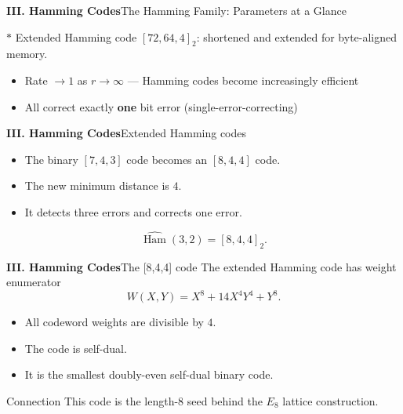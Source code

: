 \begin{frame}{\textbf{III. Hamming Codes}}{The Hamming Family: Parameters at a Glance}
\begin{center}
\end{center}

\vspace{-4pt}
{\footnotesize $*$ Extended Hamming code $[72,64,4]_2$: shortened and extended for byte-aligned memory.}

\begin{itemize}
  \item Rate $\to 1$ as $r \to \infty$ — Hamming codes become increasingly efficient
  \item All correct exactly \textbf{one} bit error (single-error-correcting)
\end{itemize}
\end{frame}

\begin{frame}{\textbf{III. Hamming Codes}}{Extended Hamming codes}
\small
{}
\begin{itemize}
  \item The binary $[7,4,3]$ code becomes an $[8,4,4]$ code.
  \item The new minimum distance is $4$.
  \item It detects three errors and corrects one error.
\end{itemize}
\[
  \widehat{\operatorname{Ham}}(3,2)=[8,4,4]_2.
\]
\end{frame}

\begin{frame}{\textbf{III. Hamming Codes}}{The [8,4,4] code}
\small
The extended Hamming code has weight enumerator
\[
  W(X,Y)=X^8+14X^4Y^4+Y^8.
\]
\begin{itemize}
  \item All codeword weights are divisible by $4$.
  \item The code is self-dual.
  \item It is the smallest doubly-even self-dual binary code.
\end{itemize}
\begin{block}{Connection}
This code is the length-$8$ seed behind the $E_8$ lattice construction.
\end{block}
\end{frame}

